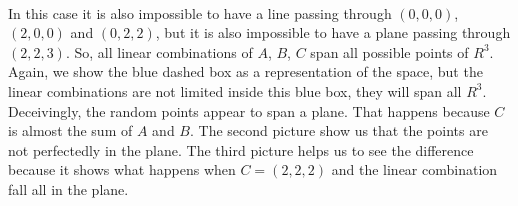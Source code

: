 \documentclass[12pt]{article}
\newcommand{\insertrep}[1]{%
	\hspace*{-2.4cm}
	\fbox{\texttt{[image: \#1]}}

}
\begin{document}
\\
In this case it is also impossible to have a line passing through $(0,0,0)$, $(2,0,0)$ and $(0,2,2)$, but it is also impossible to have a plane passing through $(2,2,3)$. So, all linear combinations of $A$, $B$, $C$ span all possible points of $R^3$.\\
Again, we show the blue dashed box as a representation of the space, but the linear combinations are not limited inside this blue box, they will span all $R^3$.\\
Deceivingly, the random points appear to span a plane. That happens because $C$ is almost the sum of $A$ and $B$. The second picture show us that the points are not perfectedly in the plane. The third picture helps us to see the difference because it shows what happens when $C=(2,2,2)$ and the linear combination fall all in the plane.
\begin{center}
	\insertrep{exercise01001c1.pdf}
\end{center}
\begin{center}
	\insertrep{exercise01001c2.pdf}
\end{center}
\begin{center}
	\insertrep{exercise01001c3.pdf}
\end{center}
\end{document}
